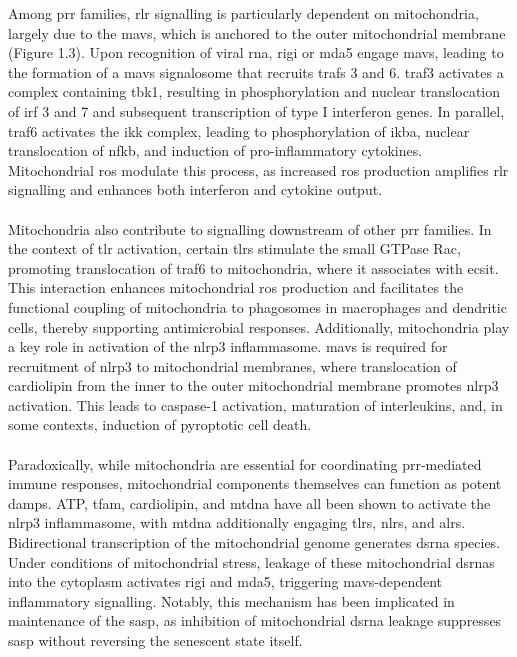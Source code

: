 Among \gls{prr} families, \gls{rlr} signalling is particularly dependent on mitochondria, largely due to the \gls{mavs}, which is anchored to the outer mitochondrial membrane\cite{harrington_mitochondria_2023, andrieux_mitochondria_2021, li_pattern_2021} (Figure 1.3). Upon recognition of viral \gls{rna}, \gls{rigi} or \gls{mda5} engage \gls{mavs}, leading to the formation of a \gls{mavs} signalosome that recruits \glspl{traf} 3 and 6. \gls{traf}3 activates a complex containing \gls{tbk1}, resulting in phosphorylation and nuclear translocation of \gls{irf} 3 and 7 and subsequent transcription of type I interferon genes\cite{andrieux_mitochondria_2021, li_pattern_2021}. In parallel, \gls{traf}6 activates the \gls{ikk} complex, leading to phosphorylation of \gls{ikba}, nuclear translocation of \gls{nfkb}, and induction of pro-inflammatory cytokines\cite{li_pattern_2021}. Mitochondrial \gls{ros} modulate this process, as increased \gls{ros} production amplifies \gls{rlr} signalling and enhances both interferon and cytokine output\cite{li_pattern_2021, tal_absence_2009}.
\\
\\
Mitochondria also contribute to signalling downstream of other \gls{prr} families. In the context of \gls{tlr} activation, certain \glspl{tlr} stimulate the small GTPase Rac, promoting translocation of \gls{traf}6 to mitochondria, where it associates with \gls{ecsit}\cite{andrieux_mitochondria_2021}. This interaction enhances mitochondrial \gls{ros} production and facilitates the functional coupling of mitochondria to phagosomes in macrophages and dendritic cells, thereby supporting antimicrobial responses\cite{andrieux_mitochondria_2021}. Additionally, mitochondria play a key role in activation of the \gls{nlrp3} inflammasome. \gls{mavs} is required for recruitment of \gls{nlrp3} to mitochondrial membranes, where translocation of cardiolipin from the inner to the outer mitochondrial membrane promotes \gls{nlrp3} activation\cite{andrieux_mitochondria_2021}. This leads to caspase-1 activation, maturation of interleukins, and, in some contexts, induction of pyroptotic cell death\cite{andrieux_mitochondria_2021, li_pattern_2021}.
\\
\\
Paradoxically, while mitochondria are essential for coordinating \gls{prr}-mediated immune responses, mitochondrial components themselves can function as potent \glspl{damp}\cite{nakahira_roles_2015}. ATP, \gls{tfam}, cardiolipin, and \gls{mtdna} have all been shown to activate the \gls{nlrp3} inflammasome, with \gls{mtdna} additionally engaging \glspl{tlr}, \glspl{nlr}, and \glspl{alr}\cite{nakahira_roles_2015}. Bidirectional transcription of the mitochondrial genome generates \gls{dsrna} species\cite{lopez-polo_release_2024}. Under conditions of mitochondrial stress, leakage of these mitochondrial \glspl{dsrna} into the cytoplasm activates \gls{rigi} and \gls{mda5}, triggering \gls{mavs}-dependent inflammatory signalling\cite{lopez-polo_release_2024}. Notably, this mechanism has been implicated in maintenance of the \gls{sasp}, as inhibition of mitochondrial \gls{dsrna} leakage suppresses \gls{sasp} without reversing the senescent state itself\cite{lopez-polo_release_2024}.

